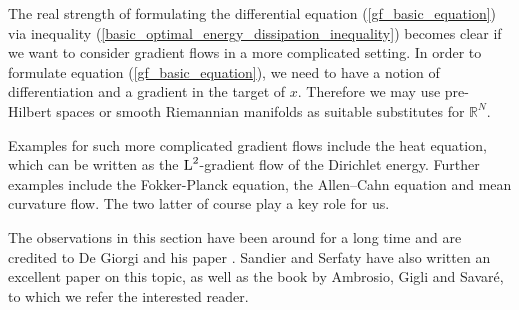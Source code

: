The real strength of formulating the differential equation 
(\ref{gf_basic_equation}) via inequality 
(\ref{basic_optimal_energy_dissipation_inequality}) becomes clear if we want to 
consider gradient flows in a more complicated setting. In order to formulate 
equation (\ref{gf_basic_equation}), we need to have a notion of differentiation 
and a gradient in the target of $ x $. Therefore we may use pre-Hilbert spaces 
or smooth Riemannian manifolds as suitable substitutes for $ \mathbb{ R }^{ N 
} $. 

Examples for such more complicated gradient flows include the heat equation, 
which can be written as the $ \operatorname{L}^{ 2 } $-gradient flow of the Dirichlet 
energy. 
Further examples include  
the Fokker-Planck equation, the Allen--Cahn equation and mean curvature flow. 
The two latter of course play a key role for us.

The observations in this section have been around for a long time and are 
credited 
to De Giorgi and his paper 
\cite{de_giorgi_new_problems_on_minimizing_movements}. Sandier and Serfaty have 
also written an excellent paper 
\cite{sandler_serfaty_gamme_convergence_of_gf_with_applications_to_gl} on this 
topic, as well as the book 
\cite{ambrosio_gigli_savare_gradient_flows_in_metric_spaces_and_in_the_space_of_prob_measures}
by Ambrosio, Gigli and 
Savaré,
to which we refer the 
interested reader.